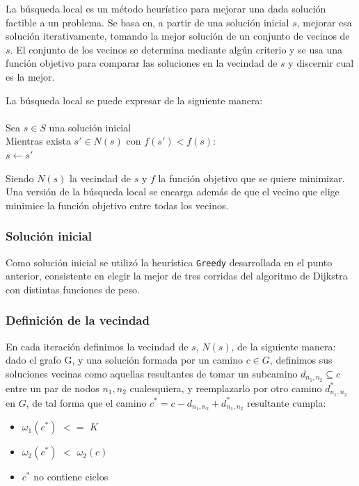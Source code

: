 La búsqueda local es un método heurístico para mejorar una dada solución factible a un problema. Se basa en, a partir de  una solución inicial $s$, mejorar esa solución iterativamente, tomando la mejor solución de un conjunto de vecinos de $s$. El conjunto de los vecinos se determina mediante algún criterio y se usa una función objetivo para comparar las soluciones en la vecindad de $s$ y discernir cual es la mejor.

La búsqueda local se puede expresar de la siguiente manera:\\\\
\hspace*{1 cm} Sea $s \in S$ una solución inicial\\
\hspace*{1 cm} Mientras exista $s' \in N(s)$ con $f(s') < f(s)$:\\
\hspace*{2 cm} $s \leftarrow s'$

Siendo $N(s)$ la vecindad de $s$ y $f$ la función objetivo que se quiere minimizar. Una versión de la búsqueda local se encarga además de que el vecino que elige minimice la función objetivo entre todas los vecinos.

\subsubsection{Solución inicial}

Como solución inicial se utilizó la heurística \texttt{Greedy} desarrollada en el punto anterior, consistente en elegir la mejor de tres corridas del algoritmo de Dijkstra con distintas funciones de peso.

\subsubsection{Definición de la vecindad}

En cada iteración definimos la vecindad de $s$, $N(s)$, de la siguiente manera: dado el grafo G, y una solución formada por un camino $c \in G$, definimos sus soluciones vecinas como aquellas resultantes de tomar un subcamino $d_{n_1,n_2} \subseteq c$ entre un par de nodos $n_1,n_2$ cualesquiera, y reemplazarlo por otro camino $d_{n_1,n_2}^*$ en $G$, de tal forma que el camino $c^* = c - d_{n_1,n_2} + d_{n_1,n_2}^*$ resultante cumpla: 

\begin{itemize}
\item $\omega_1(c^*)$ $<=$ $K$
\item $\omega_2(c^*)$ $<$ $\omega_2(c)$
\item $c^*$ no contiene ciclos
\end{itemize}

